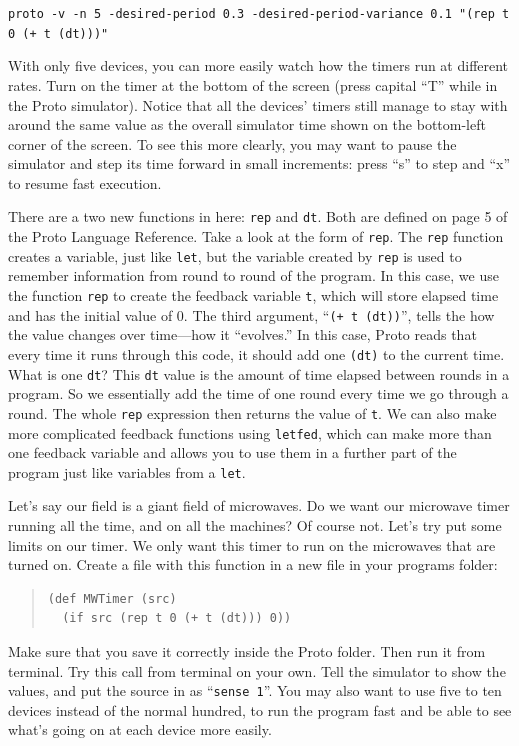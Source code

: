 \documentclass{article}
\newcommand\code[1]{\begin{center}\var{#1}\end{center}}
\newcommand\var[1]{{\tt #1}}
\newcommand\qvar[1]{``{\tt #1}''}
\begin{document}
{\code{proto -v -n 5 -desired-period 0.3 -desired-period-variance 0.1 "(rep t 0 (+ t (dt)))"}

With only five devices, you can more easily watch how the timers run
at different rates.  Turn on the timer at the bottom of the screen
(press capital ``T'' while in the Proto simulator).  Notice that all
the devices' timers still manage to stay with around the same value as
the overall simulator time shown on the bottom-left corner of the
screen.  To see this more clearly, you may want to pause the simulator
and step its time forward in small increments: press ``s'' to step and
``x'' to resume fast execution.

There are a two new functions in here: \var{rep} and \var{dt}.  Both
are defined on page 5 of the Proto Language Reference.  Take a look at
the form of \var{rep}.  The \var{rep} function creates a variable,
just like \var{let}, but the variable created by \var{rep} is used to
remember information from round to round of the program.  In this
case, we use the function \var{rep} to create the feedback variable
\var{t}, which will store elapsed time and has the initial value of 0.
The third argument, \qvar{(+ t (dt))}, tells the how the value changes
over time---how it ``evolves.''  In this case, Proto reads that every
time it runs through this code, it should add one \var{(dt)} to the
current time.  What is one \var{dt}?  This \var{dt} value is the
amount of time elapsed between rounds in a program.  So we essentially
add the time of one round every time we go through a round.  The whole
\var{rep} expression then returns the value of \var{t}.  We can also
make more complicated feedback functions using \var{letfed}, which can
make more than one feedback variable and allows you to use them in a
further part of the program just like variables from a \var{let}.

Let's say our field is a giant field of microwaves.  Do we want our
microwave timer running all the time, and on all the machines?  Of
course not.  Let's try put some limits on our timer.  We only want
this timer to run on the microwaves that are turned on.  Create a file
with this function in a new file in your programs folder:

\begin{quote}
\begin{verbatim}
(def MWTimer (src)
  (if src (rep t 0 (+ t (dt))) 0))
\end{verbatim}
\end{quote}

Make sure that you save it correctly inside the Proto folder. Then run
it from terminal.  Try this call from terminal on your own.  Tell the
simulator to show the values, and put the source in as \qvar{sense 1}.
You may also want to use five to ten devices instead of the normal
hundred, to run the program fast and be able to see what's going on at
each device more easily.

}
\end{document}
